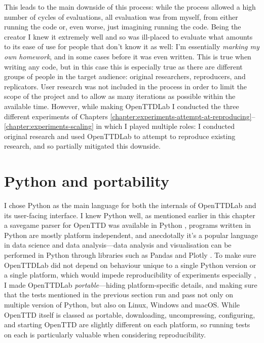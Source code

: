 \documentclass[logo,msc,dsti]{style/infthesis}    %
\begin{document}
{This leads to the main downside of this process: while the process allowed a high number of cycles of evaluations, all evaluation was from myself, from either running the code or, even worse, just imagining running the code. Being the creator I knew it extremely well and so was ill-placed to evaluate what amounts to its ease of use for people that don't know it as well: I'm essentially \emph{marking my own homework}, and in some cases before it was even written. This is true when writing any code, but in this case this is especially true as there are different groups of people in the target audience: original researchers, reproducers, and replicators. User research was not included in the process in order to limit the scope of the project and to allow as many iterations as possible within the available time. However, while making OpenTTDLab I conducted the three different experiments of Chapters \ref{chapter:experiments-attempt-at-reproducing}--\ref{chapter:experiments-scaling} in which I played multiple roles: I conducted original research and used OpenTTDLab to attempt to reproduce existing research, and so partially mitigated this downside.

\section{Python and portability}


I chose Python as the main language for both the internals of OpenTTDLab and its user-facing interface. I knew Python well, as mentioned earlier in this chapter a savegame parser for OpenTTD was available in Python \cite{Stout2024}, programs written in Python are mostly platform independent, and anecdotally it's a popular language in data science and data analysis---data analysis and visualisation can be performed in Python through libraries such as Pandas \cite{mckinney-proc-scipy-2010,reback2020pandas,} and Plotly \cite{plotly}. To make sure OpenTTDLab did not depend on behaviour unique to a single Python version or a single platform, which would impede reproducibility of experiments especially \cite{turingway2022}, I made OpenTTDLab \emph{portable}---hiding platform-specific details, and making sure that the tests mentioned in the previous section run and pass not only on multiple version of Python, but also on Linux, Windows and macOS. While OpenTTD itself is classed as portable, downloading, uncompressing, configuring, and starting OpenTTD are slightly different on each platform, so running tests on each is particularly valuable when considering reproducibility.

}
\end{document}
